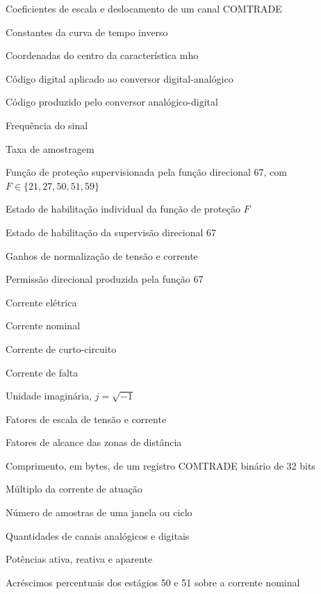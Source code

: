 \documentclass[
  12pt,
  oneside,
  a4paper,
  brazil,
  sumario=tradicional
]{abntex2}
\begin{document}
\renewcommand{\listadesimbolosname}{Lista de Símbolos}
\begin{simbolos}
  \thispagestyle{pretextualnumerado}
  \item[$a$, $b$] Coeficientes de escala e deslocamento de um canal COMTRADE
  \item[$A$, $B$, $p$] Constantes da curva de tempo inverso
  \item[$C_R$, $C_X$] Coordenadas do centro da característica mho
  \item[$d$] Código digital aplicado ao conversor digital-analógico
  \item[$d_{\mathrm{ADC}}$] Código produzido pelo conversor analógico-digital
  \item[$f$] Frequência do sinal
  \item[$f_s$] Taxa de amostragem
  \item[$F$] Função de proteção supervisionada pela função direcional 67, com $F\in\{21,27,50,51,59\}$
  \item[$E_F$] Estado de habilitação individual da função de proteção $F$
  \item[$E_{67}$] Estado de habilitação da supervisão direcional 67
  \item[$G_V$, $G_I$] Ganhos de normalização de tensão e corrente
  \item[$G_{67}$] Permissão direcional produzida pela função 67
  \item[$I$] Corrente elétrica
  \item[$I_N$] Corrente nominal
  \item[$I_{cc}$] Corrente de curto-circuito
  \item[$I_f$] Corrente de falta
  \item[$j$] Unidade imaginária, $j=\sqrt{-1}$
  \item[$K_V$, $K_I$] Fatores de escala de tensão e corrente
  \item[$k_1$, $k_2$] Fatores de alcance das zonas de distância
  \item[$L_{32}$] Comprimento, em bytes, de um registro COMTRADE binário de 32 bits
  \item[$M$] Múltiplo da corrente de atuação
  \item[$N$] Número de amostras de uma janela ou ciclo
  \item[$N_A$, $N_D$] Quantidades de canais analógicos e digitais
  \item[$P$, $Q$, $S$] Potências ativa, reativa e aparente
  \item[$p_{50}$, $p_{51}$] Acréscimos percentuais dos estágios 50 e 51 sobre a corrente nominal

\end{simbolos}
\end{document}
